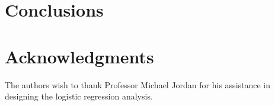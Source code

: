 \section{Conclusions}
\label{sec:conclusions}


\section{Acknowledgments}

The authors wish to thank Professor Michael Jordan for his assistance
in designing the  logistic regression
analysis.
